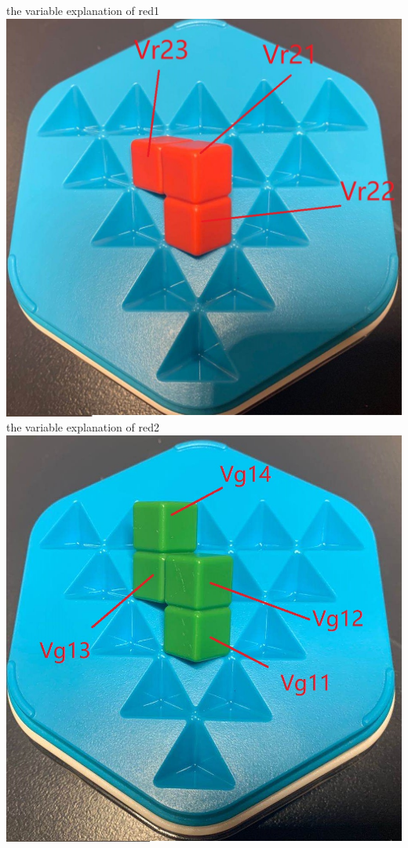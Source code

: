 \begin{center}
the variable explanation of red1\\
\includegraphics[scale=0.2]{figs/3Dred2.jpg}\\
the variable explanation of red2\\
\includegraphics[scale=0.2]{figs/3Dgreen1.jpg}\\

\end{center}
